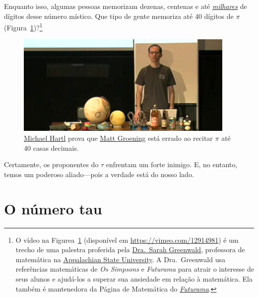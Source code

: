 Enquanto isso, algumas pessoas memorizam dezenas, centenas e até \href{https://www.guinnessworldrecords.com/world-records/most-pi-places-memorised}{\emph{milhares}} de dígitos desse número místico. Que tipo de gente memoriza até 40 dígitos de $\pi$ (Figura~\ref{fig:futurama_video})?\footnote{O vídeo na Figurea~\ref{fig:futurama_video} (disponível em \href{https://vimeo.com/12914981}{https://vimeo.com/12914981}) é um trecho de uma palestra proferida pela \href{https://cs.appstate.edu/~sjg/}{Dra.\ Sarah Greenwald}, professora de matemática na \href{https://www.appstate.edu/}{Appalachian State University}. A Dra.\ Greenwald usa referências matemáticas de \emph{Os Simpsons} e \emph{Futurama} para atrair o interesse de seus alunos e ajudá-los a superar sua ansiedade em relação à matemática. Ela também é mantenedora da Página de Matemática do \href{https://cs.appstate.edu/~sjg/futurama/}{\emph{Futurama}}.}

\begin{figure}
\begin{center}
\includegraphics{images/figures/futurama_math_lecture.png} %
\end{center}
\caption{\href{https://tauday.com/tau-manifesto/\#sec-about_the_author}{Michael Hartl} prova que \href{https://en.wikipedia.org/wiki/Matt_Groening}{Matt Groening} está errado ao recitar $\pi$ até 40 casas decimais.\label{fig:futurama_video}}
\end{figure}

Certamente, os proponentes do $\tau$ enfrentam um forte inimigo. E, no entanto, temos um poderoso aliado---pois a verdade está do nosso lado.


\section{O número tau} %
\label{sec:the_number_tau}

